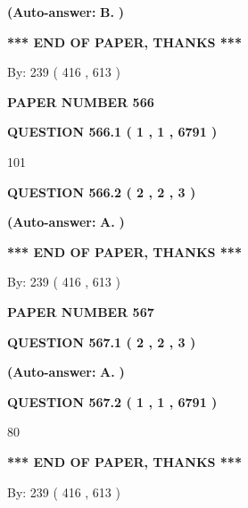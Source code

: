 \documentclass[12pt]{article}
\begin{document}
 
{\textbf{(Auto-answer:}}
{\textbf{\large{
B.}}}
{\textbf{)}}
 
 
   
   
   
   
\vspace{1.0in} 
{\textbf{\large{ *** END OF PAPER, THANKS *** }}} 
   
   
\hspace{1.0in} By: 
 239 ( 416 ,  613 )
   
   
   
   
\newpage 
\setcounter{page}{ 
   566001 } 
   
   
 {\textbf{ \Large{ PAPER NUMBER  566  }}}
   
   
   
   
  
  
{\textbf{\large{QUESTION
566.1 
 ( 1 , 1 , 6791 )
}}}

101
  
  
{\textbf{\large{QUESTION
566.2 
 ( 2 , 2 , 3 )
}}}
 
 
{\textbf{(Auto-answer:}}
{\textbf{\large{
A.}}}
{\textbf{)}}
 
 
   
   
   
   
\vspace{1.0in} 
{\textbf{\large{ *** END OF PAPER, THANKS *** }}} 
   
   
\hspace{1.0in} By: 
 239 ( 416 ,  613 )
   
   
   
   
\newpage 
\setcounter{page}{ 
   567001 } 
   
   
 {\textbf{ \Large{ PAPER NUMBER  567  }}}
   
   
   
   
  
  
{\textbf{\large{QUESTION
567.1 
 ( 2 , 2 , 3 )
}}}
 
 
{\textbf{(Auto-answer:}}
{\textbf{\large{
A.}}}
{\textbf{)}}
 
 
  
  
{\textbf{\large{QUESTION
567.2 
 ( 1 , 1 , 6791 )
}}}

80
   
   
   
   
\vspace{1.0in} 
{\textbf{\large{ *** END OF PAPER, THANKS *** }}} 
   
   
\hspace{1.0in} By: 
 239 ( 416 ,  613 )
   
   
   
\end{document}

